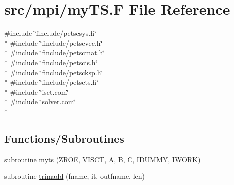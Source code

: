 \hypertarget{mpi_2my_t_s_8_f}{\section{src/mpi/my\-T\-S.F File Reference}
\label{mpi_2my_t_s_8_f}
}
{\ttfamily \#include \char`\"{}finclude/petscsys.\-h\char`\"{}}\\*
{\ttfamily \#include \char`\"{}finclude/petscvec.\-h\char`\"{}}\\*
{\ttfamily \#include \char`\"{}finclude/petscmat.\-h\char`\"{}}\\*
{\ttfamily \#include \char`\"{}finclude/petscis.\-h\char`\"{}}\\*
{\ttfamily \#include \char`\"{}finclude/petscksp.\-h\char`\"{}}\\*
{\ttfamily \#include \char`\"{}finclude/petscts.\-h\char`\"{}}\\*
{\ttfamily \#include \char`\"{}iset.\-com\char`\"{}}\\*
{\ttfamily \#include \char`\"{}solver.\-com\char`\"{}}\\*
\subsection*{Functions/\-Subroutines}
\begin{DoxyCompactItemize}
\item 
subroutine \hyperlink{mpi_2my_t_s_8_f_a4cade51e0688fec0f195914719d9cb3d}{myts} (\hyperlink{myts_8com_a0c4fbcdb78e6b50c8919d714e4b5a694}{Z\-R\-O\-E}, \hyperlink{myts_8com_accf7addb2159476a2ff0ba7d99b8bbbc}{V\-I\-S\-C\-T}, \hyperlink{ibc2_8com_ad2108d58343608772fff791c23da58f5}{A}, B, C, I\-D\-U\-M\-M\-Y, I\-W\-O\-R\-K)
\item 
subroutine \hyperlink{mpi_2my_t_s_8_f_a8dffd0883a3b978d39b4f4154a9584a3}{trimadd} (fname, it, outfname, len)
\end{DoxyCompactItemize}


